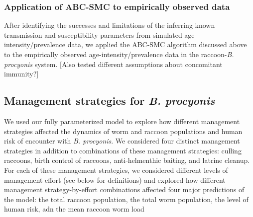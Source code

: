 \documentclass[11pt]{article}
\begin{document}
\subsubsection{Application of ABC-SMC to empirically observed data}

After identifying the successes and limitations of the inferring known transmission and susceptibility parameters from simulated age-intensity/prevalence data, we applied the ABC-SMC algorithm discussed above to the empirically observed age-intensity/prevalence data in the raccoon-\emph{B. procyonis} system. [Also tested different assumptions about concomitant immunity?]


\subsection{Management strategies for \emph{B. procyonis}}

We used our fully parameterized model to explore how different
management strategies affected the dynamics of worm and raccoon
populations and human risk of encounter with \emph{B. procyonis}. We considered four
distinct management strategies in addition to combinations of these
management strategies: culling raccoons, birth control of raccoons,
anti-helmenthic baiting, and latrine cleanup. For each of these
management strategies, we considered different levels of management
effort (see below for definitions) and explored how different management
strategy-by-effort combinations affected four major predictions of the
model: the total raccoon population, the total worm population, the level of human risk, adn the mean raccoon worm load
\end{document}
